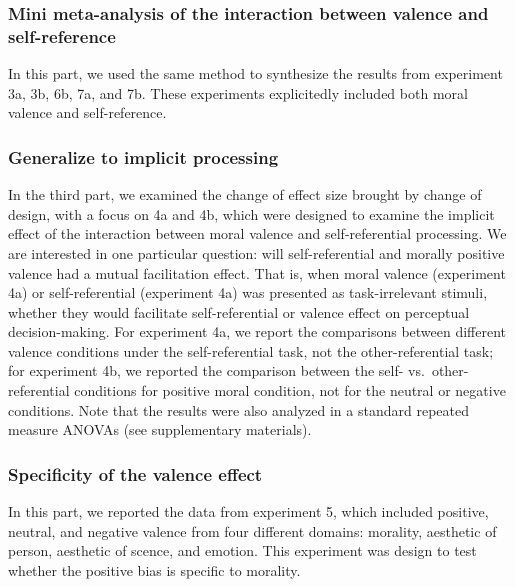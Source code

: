 \documentclass[man]{apa6}
\begin{document}
\hypertarget{mini-meta-analysis-of-the-interaction-between-valence-and-self-reference}{%
\subsubsection{Mini meta-analysis of the interaction between valence and self-reference}\label{mini-meta-analysis-of-the-interaction-between-valence-and-self-reference}}

In this part, we used the same method to synthesize the results from experiment 3a, 3b, 6b, 7a, and 7b. These experiments explicitedly included both moral valence and self-reference.

\hypertarget{generalize-to-implicit-processing}{%
\subsubsection{Generalize to implicit processing}\label{generalize-to-implicit-processing}}

In the third part, we examined the change of effect size brought by change of design, with a focus on 4a and 4b, which were designed to examine the implicit effect of the interaction between moral valence and self-referential processing. We are interested in one particular question: will self-referential and morally positive valence had a mutual facilitation effect. That is, when moral valence (experiment 4a) or self-referential (experiment 4a) was presented as task-irrelevant stimuli, whether they would facilitate self-referential or valence effect on perceptual decision-making. For experiment 4a, we report the comparisons between different valence conditions under the self-referential task, not the other-referential task; for experiment 4b, we reported the comparison between the self- vs.~other-referential conditions for positive moral condition, not for the neutral or negative conditions. Note that the results were also analyzed in a standard repeated measure ANOVAs (see supplementary materials).

\hypertarget{specificity-of-the-valence-effect}{%
\subsubsection{Specificity of the valence effect}\label{specificity-of-the-valence-effect}}

In this part, we reported the data from experiment 5, which included positive, neutral, and negative valence from four different domains: morality, aesthetic of person, aesthetic of scence, and emotion. This experiment was design to test whether the positive bias is specific to morality.
\end{document}
